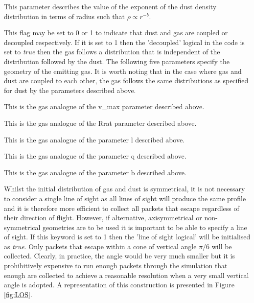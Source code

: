
This parameter describes the value of the exponent of the dust density distribution in terms of radius such that $\rho \propto r^{-b}$.


This flag may be set to 0 or 1 to indicate that dust and gas are coupled or decoupled respectively.  If it is set to 1 then the 'decoupled' logical in the code is set to \textit{true} then the gas follows a distribution that is independent of the distribution followed by the dust.  The following five parameters specify the geometry of the emitting gas.  It is worth noting that in the case where gas and dust are coupled to each other, the gas follows the same distributions as specified for dust by the parameters described above. 


This is the gas analogue of the v\_max parameter described above.  


This is the gas analogue of the Rrat parameter described above.  


This is the gas analogue of the parameter l described above.  


This is the gas analogue of the parameter q described above.  


This is the gas analogue of the parameter b described above.  



 Whilst the initial distribution of gas and dust is symmetrical, it is not necessary to consider a single line of sight as all lines of sight will produce the same profile and it is therefore more efficient to collect all packets that escape regardless of their direction of flight.  However, if alternative, axisymmetrical or non-symmetrical geometries are to be used it is important to be able to specify a line of sight.  If this keyword is set to 1 then the 'line of sight logical' will be initialised as \textit{true}.  Only packets that escape within a cone of vertical angle $\pi/6$ will be collected.  Clearly, in practice, the angle would be very much smaller but it is prohibitively expensive to run enough packets through the simulation that enough are collected to achieve a reasonable resolution when a very small vertical angle is adopted.  A representation of this construction is presented in Figure \ref{fig:LOS}.

